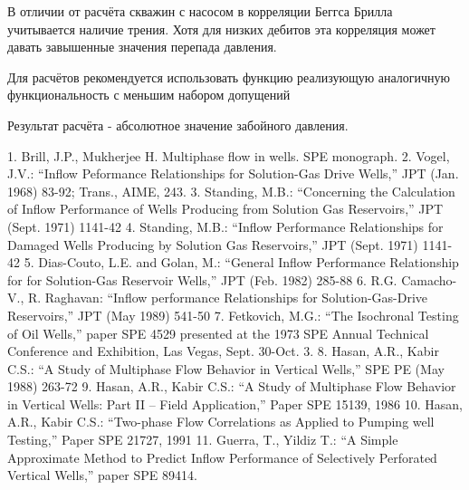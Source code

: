 \documentclass[]{scrreprt}
\begin{document}
В отличии от расчёта скважин с насосом в корреляции Беггса Брилла учитывается наличие трения. Хотя для низких дебитов эта корреляция может давать завышенные значения перепада давления. 

Для расчётов рекомендуется использовать функцию \unf реализующую аналогичную функциональность с меньшим набором допущений

Результат расчёта - абсолютное значение забойного давления. 


\cite{HasanKabir_HeatTransfer_2002}

{}



1.	Brill, J.P., Mukherjee H. Multiphase flow in wells. SPE monograph.
2.	Vogel, J.V.: “Inflow Peformance Relationships for Solution-Gas Drive Wells,” JPT (Jan. 1968) 83-92; Trans., AIME, 243.
3.	Standing, M.B.: “Concerning the Calculation of Inflow Performance of Wells Producing from Solution Gas Reservoirs,” JPT (Sept. 1971) 1141-42
4.	Standing, M.B.: “Inflow Performance Relationships for Damaged Wells Producing by Solution Gas Reservoirs,” JPT (Sept. 1971) 1141-42
5.	Dias-Couto, L.E. and Golan, M.: “General Inflow Performance Relationship for for Solution-Gas Reservoir Wells,” JPT (Feb. 1982) 285-88
6.	R.G. Camacho-V., R. Raghavan: “Inflow performance Relationships for Solution-Gas-Drive Reservoirs,”  JPT (May 1989) 541-50
7.	Fetkovich, M.G.: “The Isochronal Testing of Oil Wells,” paper SPE 4529 presented at the 1973 SPE Annual Technical  Conference and Exhibition, Las Vegas, Sept. 30-Oct. 3.
8.	Hasan, A.R., Kabir C.S.: “A Study of Multiphase Flow Behavior in Vertical Wells,” SPE PE (May 1988) 263-72
9.	Hasan, A.R., Kabir C.S.: “A Study of Multiphase Flow Behavior in Vertical Wells: Part II – Field Application,” Paper SPE 15139, 1986
10.	Hasan, A.R., Kabir C.S.: “Two-phase Flow Correlations as Applied to Pumping well Testing,” Paper SPE 21727, 1991
11.	 Guerra, T., Yildiz T.: “A Simple Approximate Method to Predict Inflow Performance of Selectively Perforated Vertical Wells,” paper SPE 89414.
\end{document}
